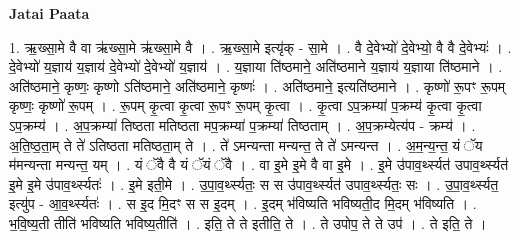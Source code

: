 \documentclass[17pt]{extarticle}
\begin{document}
\textbf{Jatai Paata} \newline

1. ऋ॒ख्सा॒मे वै वा ऋ॑ख्सा॒मे ऋ॑ख्सा॒मे वै । . ऋ॒ख्सा॒मे इत्यृ॑क् - सा॒मे । . वै दे॒वेभ्यो॑ दे॒वेभ्यो॒ वै वै दे॒वेभ्यः॑ । . दे॒वेभ्यो॑ य॒ज्ञाय॑ य॒ज्ञाय॑ दे॒वेभ्यो॑ दे॒वेभ्यो॑ य॒ज्ञाय॑ । . य॒ज्ञाया ति॑ष्ठमाने॒ अति॑ष्ठमाने य॒ज्ञाय॑ य॒ज्ञाया ति॑ष्ठमाने । . अति॑ष्ठमाने॒ कृष्णः॒ कृष्णो ऽति॑ष्ठमाने॒ अति॑ष्ठमाने॒ कृष्णः॑ । . अति॑ष्ठमाने॒ इत्यति॑ष्ठमाने । . कृष्णो॑ रू॒पꣳ रू॒पम् कृष्णः॒ कृष्णो॑ रू॒पम् । . रू॒पम् कृ॒त्वा कृ॒त्वा रू॒पꣳ रू॒पम् कृ॒त्वा । . कृ॒त्वा ऽप॒क्रम्या॑ प॒क्रम्य॑ कृ॒त्वा कृ॒त्वा ऽप॒क्रम्य॑ । . अ॒प॒क्रम्या॑ तिष्ठता मतिष्ठता मप॒क्रम्या॑ प॒क्रम्या॑ तिष्ठताम् । . अ॒प॒क्रम्येत्य॑प - क्रम्य॑ । . अ॒ति॒ष्ठ॒ता॒म् ते ते॑ ऽतिष्ठता मतिष्ठता॒म् ते । . ते॑ ऽमन्यन्ता मन्यन्त॒ ते ते॑ ऽमन्यन्त । . अ॒म॒न्य॒न्त॒ यं ॅय म॑मन्यन्ता मन्यन्त॒ यम् । . यं ॅवै वै यं ॅयं ॅवै । . वा इ॒मे इ॒मे वै वा इ॒मे । . इ॒मे उ॑पाव॒र्थ्स्यत॑ उपाव॒र्थ्स्यत॑ इ॒मे इ॒मे उ॑पाव॒र्थ्स्यतः॑ । . इ॒मे इती॒मे । . उ॒पा॒व॒र्थ्स्यतः॒ स स उ॑पाव॒र्थ्स्यत॑ उपाव॒र्थ्स्यतः॒ सः । . उ॒पा॒व॒र्थ्स्यत॒ इत्यु॑प - आ॒व॒र्थ्स्यतः॑ । . स इ॒द मि॒दꣳ स स इ॒दम् । . इ॒दम् भ॑विष्यति भविष्यती॒द मि॒दम् भ॑विष्यति । . भ॒वि॒ष्य॒ती तीति॑ भविष्यति भविष्य॒तीति॑ । . इति॒ ते ते इतीति॒ ते । . ते उपोप॒ ते ते उप॑ । . ते इति॒ ते । \newline
\end{document}
